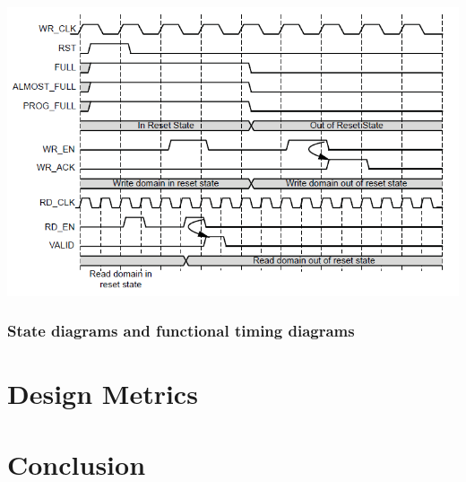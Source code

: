 \documentclass[12pt]{article}
\begin{document}
\includegraphics[width=\textwidth]{processed_image_pngs/fifo_timing.png}

\subsubsection{State diagrams and functional timing diagrams}

\section{Design Metrics}

\section{Conclusion}
\end{document}
